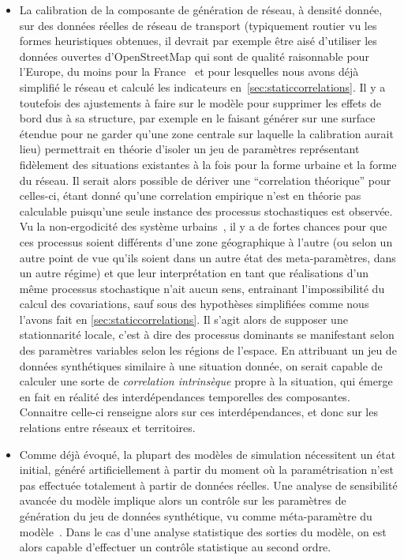 {\begin{itemize}
\item La calibration de la composante de génération de réseau, à densité donnée, sur des données réelles de réseau de transport (typiquement routier vu les formes heuristiques obtenues, il devrait par exemple être aisé d'utiliser les données ouvertes d'OpenStreetMap qui sont de qualité raisonnable pour l'Europe, du moins pour la France~\cite{girres2010quality} et pour lesquelles nous avons déjà simplifié le réseau et calculé les indicateurs en~\ref{sec:staticcorrelations}. Il y a toutefois des ajustements à faire sur le modèle pour supprimer les effets de bord dus à sa structure, par exemple en le faisant générer sur une surface étendue pour ne garder qu'une zone centrale sur laquelle la calibration aurait lieu) permettrait en théorie d'isoler un jeu de paramètres représentant fidèlement des situations existantes à la fois pour la forme urbaine et la forme du réseau. Il serait alors possible de dériver une ``correlation théorique'' pour celles-ci, étant donné qu'une correlation empirique n'est en théorie pas calculable puisqu'une seule instance des processus stochastiques est observée. Vu la non-ergodicité des système urbains~\cite{pumain2012urban}, il y a de fortes chances pour que ces processus soient différents d'une zone géographique à l'autre (ou selon un autre point de vue qu'ils soient dans un autre état des meta-paramètres, dans un autre régime) et que leur interprétation en tant que réalisations d'un même processus stochastique n'ait aucun sens, entrainant l'impossibilité du calcul des covariations, sauf sous des hypothèses simplifiées comme nous l'avons fait en \ref{sec:staticcorrelations}. Il s'agit alors de supposer une stationnarité locale, c'est à dire des processus dominants se manifestant selon des paramètres variables selon les régions de l'espace. En attribuant un jeu de données synthétiques similaire à une situation donnée, on serait capable de calculer une sorte de \emph{correlation intrinsèque} propre à la situation, qui émerge en fait en réalité des interdépendances temporelles des composantes. Connaitre celle-ci renseigne alors sur ces interdépendances, et donc sur les relations entre réseaux et territoires.
\item Comme déjà évoqué, la plupart des modèles de simulation nécessitent un état initial, généré artificiellement à partir du moment où la paramétrisation n'est pas effectuée totalement à partir de données réelles. Une analyse de sensibilité avancée du modèle implique alors un contrôle sur les paramètres de génération du jeu de données synthétique, vu comme méta-paramètre du modèle~\cite{cottineau2015revisiting}. Dans le cas d'une analyse statistique des sorties du modèle, on est alors capable d'effectuer un contrôle statistique au second ordre.

\end{itemize}}
